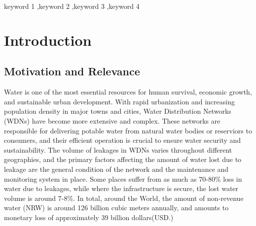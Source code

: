\documentclass[final,5p,times,twocolumn,authoryear]{elsarticle}
\begin{document}
\begin{frontmatter}


\begin{keyword}
keyword 1 \sep keyword 2 \sep keyword 3 \sep keyword 4



\end{keyword}


\end{frontmatter}




\section{Introduction}
\label{introduction}

\subsection{Motivation and Relevance}
Water is one of the most essential resources for human survival, economic growth, and sustainable urban development. With rapid urbanization and increasing population density in major towns and cities, Water Distribution Networks (WDNs) have become more extensive and complex.  These networks are responsible for delivering potable water from natural water bodies or reserviors to consumers, and their efficient operation is crucial to ensure water security and sustainability.
The volume of leakages in WDNs varies throughout different geographies, and the primary factors affecting the amount of water lost due to leakage are the general condition of the network and the maintenance and monitoring system in place. Some places suffer from as much as 70-80\% loss in water due to leakages, while where the infrastructure is secure, the lost water volume is around 7-8\%. In total, around the World, the amount of non-revenue water (NRW) is around 126 billion cubic meters annually, and amounts to monetary loss of approximately 39 billion dollars(USD.)
\end{document}
